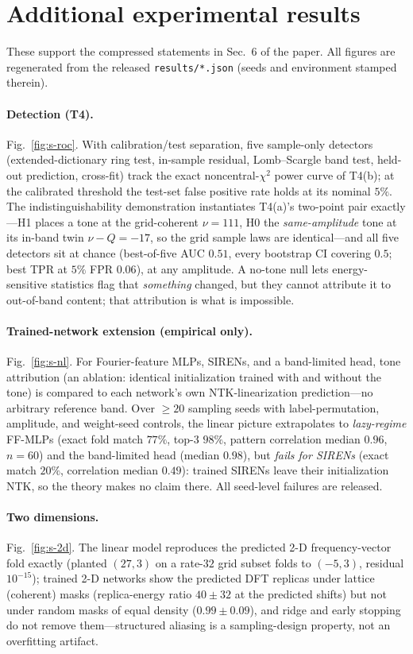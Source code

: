 \documentclass[10pt]{article}
\begin{document}
\section{Additional experimental results}
These support the compressed statements in Sec.~6 of the paper.  All figures are
regenerated from the released \texttt{results/*.json} (seeds and environment stamped
therein).

\paragraph{Detection (T4).}  Fig.~\ref{fig:s-roc}.  With calibration/test separation,
five sample-only detectors (extended-dictionary ring test, in-sample residual,
Lomb--Scargle band test, held-out prediction, cross-fit) track the exact
noncentral-$\chi^2$ power curve of T4(b); at the calibrated threshold the test-set false
positive rate holds at its nominal $5\%$.  The indistinguishability demonstration
instantiates T4(a)'s two-point pair exactly---H1 places a tone at the grid-coherent
$\nu{=}111$, H0 the \emph{same-amplitude} tone at its in-band twin $\nu-Q=-17$, so the
grid sample laws are identical---and all five detectors sit at chance (best-of-five
AUC $0.51$, every bootstrap CI covering $0.5$; best TPR at $5\%$ FPR $0.06$), at any
amplitude.  A no-tone null lets energy-sensitive statistics flag that \emph{something}
changed, but they cannot attribute it to out-of-band content; that attribution is what is
impossible.

\paragraph{Trained-network extension (empirical only).}  Fig.~\ref{fig:s-nl}.  For
Fourier-feature MLPs, SIRENs, and a band-limited head, tone attribution (an ablation:
identical initialization trained with and without the tone) is compared to each network's
own NTK-linearization prediction---no arbitrary reference band.  Over $\ge20$ sampling
seeds with label-permutation, amplitude, and weight-seed controls, the linear picture
extrapolates to \emph{lazy-regime} FF-MLPs (exact fold match $77\%$, top-3 $98\%$, pattern
correlation median $0.96$, $n{=}60$) and the band-limited head (median $0.98$), but
\emph{fails for SIRENs} (exact match $20\%$, correlation median $0.49$): trained SIRENs
leave their initialization NTK, so the theory makes no claim there.  All seed-level
failures are released.

\paragraph{Two dimensions.}  Fig.~\ref{fig:s-2d}.  The linear model reproduces the
predicted 2-D frequency-vector fold exactly (planted $(27,3)$ on a rate-$32$ grid subset
folds to $(-5,3)$, residual $10^{-15}$); trained 2-D networks show the predicted DFT
replicas under lattice (coherent) masks (replica-energy ratio $40{\pm}32$ at the predicted
shifts) but not under random masks of equal density ($0.99{\pm}0.09$), and ridge and early
stopping do not remove them---structured aliasing is a sampling-design property, not an
overfitting artifact.
\end{document}
